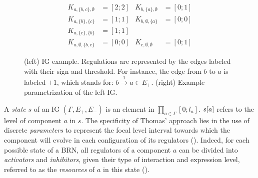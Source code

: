 \begin{figure}[t]
\begin{minipage}{0.4\linewidth}
\centering
{}
\end{minipage}
\begin{minipage}{0.6\linewidth}
\centering
\begin{align*}
K_{a,\{b,c\},\emptyset} &= [2 ; 2] & K_{b,\{a\},\emptyset} &= [0 ; 1] \\
K_{a,\{b\},\{c\}} &= [1 ; 1] & K_{b,\emptyset,\{a\}} &= [0 ; 0] \\
K_{a,\{c\},\{b\}} &= [1 ; 1] &&\\
K_{a,\emptyset,\{b,c\}} &= [0 ; 0] & K_{c,\emptyset,\emptyset} &= [0 ; 1]
\end{align*}
\end{minipage}
\caption{\label{fig:runningBRN}
(left)
IG example.
Regulations are represented by the edges labeled with their sign and threshold.
For instance, the edge from $b$ to $a$ is labeled $+1$, which stands for: $b \xrightarrow{1} a \in
E_+$.
(right)
Example parametrization of the left IG.
}
\end{figure}

A \emph{state} $s$ of an IG $(\Gamma, E_+, E_-)$ is an element in $\prod_{a \in \Gamma} [0;l_a]$.
${s[a]}$ refers to the level of component $a$ in $s$.
The specificity of Thomas' approach lies in the use of discrete \emph{parameters} to represent the
focal level interval towards which the component will evolve in each configuration of its regulators
().
Indeed, for each possible state of a BRN, all regulators of a component $a$ can be divided into
\emph{activators} and \emph{inhibitors}, given their type of interaction and expression level,
referred to as the \emph{resources} of $a$ in this state ().

